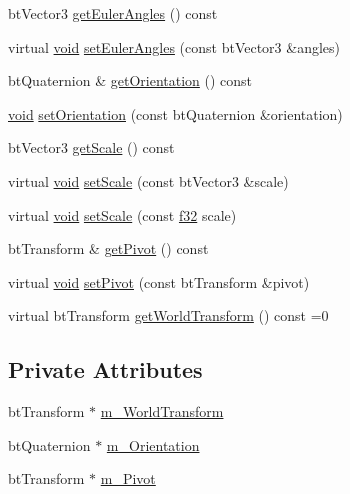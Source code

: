 \begin{DoxyCompactItemize}
\item 
bt\+Vector3 \mbox{\hyperlink{classnjli_1_1_abstract_transform_a1a9cf70d9ae4b9405500be603e74b4e8}{get\+Euler\+Angles}} () const
\item 
virtual \mbox{\hyperlink{_thread_8h_af1e856da2e658414cb2456cb6f7ebc66}{void}} \mbox{\hyperlink{classnjli_1_1_abstract_transform_a758c5d11698115dac64ec6e4ba29c5bb}{set\+Euler\+Angles}} (const bt\+Vector3 \&angles)
\item 
bt\+Quaternion \& \mbox{\hyperlink{classnjli_1_1_abstract_transform_af23dedd0d33968d9f4066056d442d8ab}{get\+Orientation}} () const
\item 
\mbox{\hyperlink{_thread_8h_af1e856da2e658414cb2456cb6f7ebc66}{void}} \mbox{\hyperlink{classnjli_1_1_abstract_transform_a8668e1e13020412115e65b7e50176262}{set\+Orientation}} (const bt\+Quaternion \&orientation)
\item 
bt\+Vector3 \mbox{\hyperlink{classnjli_1_1_abstract_transform_a292f90f311e9af8e2bffc630b100ca2b}{get\+Scale}} () const
\item 
virtual \mbox{\hyperlink{_thread_8h_af1e856da2e658414cb2456cb6f7ebc66}{void}} \mbox{\hyperlink{classnjli_1_1_abstract_transform_ab9059ed0b04b3e5af674ce2652ffda35}{set\+Scale}} (const bt\+Vector3 \&scale)
\item 
virtual \mbox{\hyperlink{_thread_8h_af1e856da2e658414cb2456cb6f7ebc66}{void}} \mbox{\hyperlink{classnjli_1_1_abstract_transform_ab3fe736cb93cd9853a675131f34404ff}{set\+Scale}} (const \mbox{\hyperlink{_util_8h_a5f6906312a689f27d70e9d086649d3fd}{f32}} scale)
\item 
bt\+Transform \& \mbox{\hyperlink{classnjli_1_1_abstract_transform_aec6866eb4cc32cc1f7aecae2f5a55422}{get\+Pivot}} () const
\item 
virtual \mbox{\hyperlink{_thread_8h_af1e856da2e658414cb2456cb6f7ebc66}{void}} \mbox{\hyperlink{classnjli_1_1_abstract_transform_aa2adbe5fcda38419fa30b22a59f734b3}{set\+Pivot}} (const bt\+Transform \&pivot)
\item 
virtual bt\+Transform \mbox{\hyperlink{classnjli_1_1_abstract_transform_a25e1a5d3daf3c0c5839915f33e37e51a}{get\+World\+Transform}} () const =0
\end{DoxyCompactItemize}
\subsection*{Private Attributes}
\begin{DoxyCompactItemize}
\item 
bt\+Transform $\ast$ \mbox{\hyperlink{classnjli_1_1_abstract_transform_a90ca5d67abcb0a5ea1e3c3554c9f8e0e}{m\+\_\+\+World\+Transform}}
\item 
bt\+Quaternion $\ast$ \mbox{\hyperlink{classnjli_1_1_abstract_transform_ab86688491ad0a42d93ebf4242a12c17e}{m\+\_\+\+Orientation}}
\item 
bt\+Transform $\ast$ \mbox{\hyperlink{classnjli_1_1_abstract_transform_a6c1eda10f9fa9bd340e3b1a560f3954a}{m\+\_\+\+Pivot}}
\end{DoxyCompactItemize}



